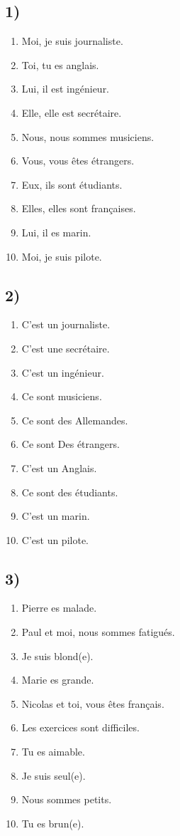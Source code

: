 \subsection*{1)}

\begin{enumerate}
    \item Moi, je suis journaliste.
    \item Toi, tu es anglais.
    \item Lui, il est ingénieur.
    \item Elle, elle est secrétaire.
    \item Nous, nous sommes musiciens.
    \item Vous, vous êtes étrangers.
    \item Eux, ils sont étudiants.
    \item Elles, elles sont françaises.
    \item Lui, il es marin.
    \item Moi, je suis pilote.
\end{enumerate}

\subsection*{2)}

\begin{enumerate}
    \item C'est un journaliste.
    \item C'est une secrétaire.
    \item C'est un ingénieur.
    \item Ce sont musiciens.
    \item Ce sont des Allemandes.
    \item Ce sont Des étrangers.
    \item C'est un Anglais.
    \item Ce sont des étudiants.
    \item C'est un marin.
    \item C'est un pilote.
\end{enumerate}

\subsection*{3)}

\begin{enumerate}
    \item Pierre es malade.
    \item Paul et moi, nous sommes fatigués.
    \item Je suis blond(e).
    \item Marie es grande.
    \item Nicolas et toi, vous êtes français.
    \item Les exercices sont difficiles.
    \item Tu es aimable.
    \item Je suis seul(e).
    \item Nous sommes petits.
    \item Tu es brun(e).
\end{enumerate}

